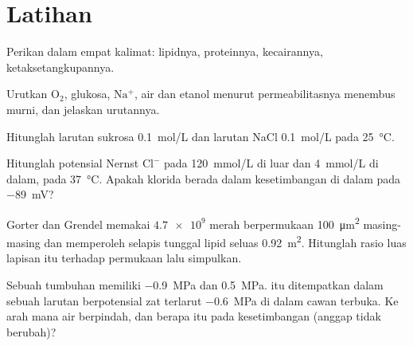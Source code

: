 \section{Latihan}

\begin{exercise}[$\star$]\label{exo:b1:membranes-transport:1}
Perikan  dalam empat kalimat: lipidnya, proteinnya,
kecairannya, ketaksetangkupannya.
\end{exercise}

\begin{exercise}[$\star$]\label{exo:b1:membranes-transport:2}
Urutkan $\mathrm{O_2}$, glukosa, $\mathrm{Na^+}$, air dan etanol
menurut permeabilitasnya menembus  murni, dan jelaskan
urutannya.
\end{exercise}

\begin{exercise}[$\star$]\label{exo:b1:membranes-transport:3}
Hitunglah  larutan sukrosa \qty{0.1}{mol/L} dan
larutan NaCl \qty{0.1}{mol/L} pada \qty{25}{\celsius}.
\end{exercise}

\begin{exercise}[$\star$]\label{exo:b1:membranes-transport:4}
Hitunglah potensial Nernst $\mathrm{Cl^-}$ pada \qty{120}{mmol/L} di
luar dan \qty{4}{mmol/L} di dalam, pada \qty{37}{\celsius}. Apakah
klorida berada dalam kesetimbangan di dalam  pada \qty{-89}{mV}?
\end{exercise}

\begin{exercise}[$\star\star$]\label{exo:b1:membranes-transport:5}
Gorter dan Grendel memakai $\num{4.7e9}$  merah berpermukaan
\qty{100}{\micro m^2} masing-masing dan memperoleh selapis tunggal
lipid seluas \qty{0.92}{m^2}. Hitunglah rasio luas lapisan itu terhadap
permukaan  lalu simpulkan.
\end{exercise}

\begin{exercise}[$\star\star$]\label{exo:b1:membranes-transport:6}
Sebuah  tumbuhan memiliki  \qty{-0.9}{MPa} dan
 \qty{0.5}{MPa}.  itu ditempatkan dalam sebuah
larutan berpotensial zat terlarut \qty{-0.6}{MPa} di dalam cawan
terbuka. Ke arah mana air berpindah, dan berapa  
itu pada kesetimbangan (anggap  tidak berubah)?
\end{exercise}

